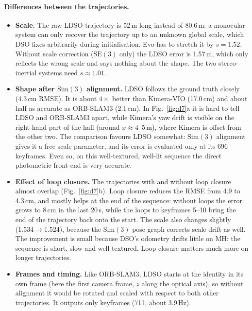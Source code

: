 \documentclass[11pt,a4paper]{article}
\DeclareRobustCommand{\code}[1]{\begingroup\ttfamily\codebreaks#1\endgroup}
\newcommand{\codebreaks}{\renewcommand{\_}{\textunderscore\allowbreak}}
\begin{document}
\paragraph{Differences between the trajectories.}
\begin{itemize}
\item \textbf{Scale.} The raw LDSO trajectory is 52\,m long instead of 80.6\,m: a monocular
  system can only recover the trajectory up to an unknown global scale, which DSO fixes
  arbitrarily during initialisation. Evo has to stretch it by $s=1.52$. Without scale
  correction ($\mathrm{SE}(3)$ only) the LDSO error is 1.57\,m, which only reflects the wrong
  scale and says nothing about the shape. The two stereo-inertial systems need $s\approx1.01$.
\item \textbf{Shape after $\mathrm{Sim}(3)$ alignment.} LDSO follows the ground truth closely
  (4.3\,cm RMSE). It is about $4\times$ better than Kimera-VIO (17.0\,cm) and about half as
  accurate as ORB-SLAM3 (2.1\,cm). In Fig.~\ref{fig:d7}a it is hard to tell LDSO and ORB-SLAM3
  apart, while Kimera's yaw drift is visible on the right-hand part of the hall (around
  $x\approx4$--5\,m), where Kimera is offset from the other two. The comparison favours LDSO
  somewhat: $\mathrm{Sim}(3)$ alignment gives it a free scale parameter, and its error is
  evaluated only at its 696 keyframes. Even so, on this well-textured, well-lit sequence the
  direct photometric front-end is very accurate.
\item \textbf{Effect of loop closure.} The trajectories with and without loop closure almost
  overlap (Fig.~\ref{fig:d7}b). Loop closure reduces the RMSE from 4.9 to 4.3\,cm, and mostly
  helps at the end of the sequence: without loops the error grows to 8\,cm in the last
  20\,s, while the loops to keyframes 5--10 bring the end of the trajectory back onto the
  start. The scale also changes slightly (1.534$\to$1.524), because the $\mathrm{Sim}(3)$ pose
  graph corrects scale drift as well. The improvement is small because DSO's odometry drifts
  little on \code{MH\_01}: the sequence is short, slow and well textured. Loop closure matters
  much more on longer trajectories.
\item \textbf{Frames and timing.} Like ORB-SLAM3, LDSO starts at the identity in its own
  frame (here the first camera frame, $z$ along the optical axis), so without alignment it
  would be rotated and scaled with respect to both other trajectories. It outputs only
  keyframes (711, about 3.9\,Hz).
\end{itemize}
\end{document}
